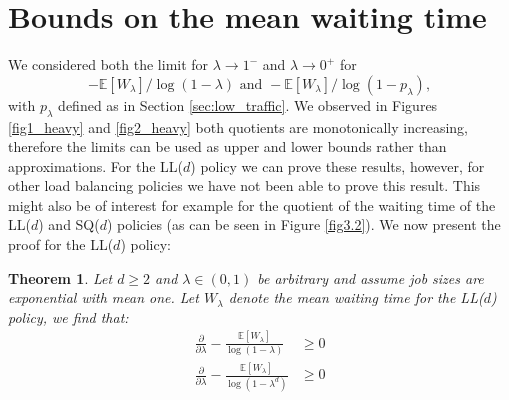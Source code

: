 \documentclass[12pt]{report}
\newcommand{\E}{\mathbb{E}}
\newtheorem{theorem}{Theorem}
\begin{document}
\section{Bounds on the mean waiting time}
We considered both the limit for $\lambda\rightarrow 1^-$ and $\lambda \rightarrow 0^+$ for
$$
-\E[W_\lambda]/\log(1-\lambda)
\mbox{ and }
-\E[W_\lambda]/\log(1-p_\lambda),$$
with $p_\lambda$ defined as in Section \ref{sec:low_traffic}. We observed in Figures \ref{fig1_heavy} and \ref{fig2_heavy} both quotients are monotonically increasing, therefore the limits can be used as upper and lower bounds rather than approximations. For the LL($d$) policy we can prove these results, however, for other load balancing policies we have not been able to prove this result. This might also be of interest for example for the quotient of the waiting time of the LL($d$) and SQ($d$) policies (as can be seen in Figure \ref{fig3.2}). We now present the proof for the LL($d$) policy:
\begin{theorem}
	Let $d \geq 2$ and $\lambda \in (0,1)$ be arbitrary and assume job sizes are exponential with mean one. Let $W_\lambda$ denote the mean waiting time for the LL($d$) policy, we find that:
	\begin{align}
		\frac{\partial}{\partial \lambda} - \frac{\E[W_\lambda]}{\log(1-\lambda)} &\geq 0 \label{eq:monotonicity_heavy1}\\
		\frac{\partial}{\partial \lambda} - \frac{\E[W_\lambda]}{\log(1-\lambda^d)} &\geq 0 \label{eq:monotonicity_heavy2}
	\end{align}
\end{theorem}
\end{document}
